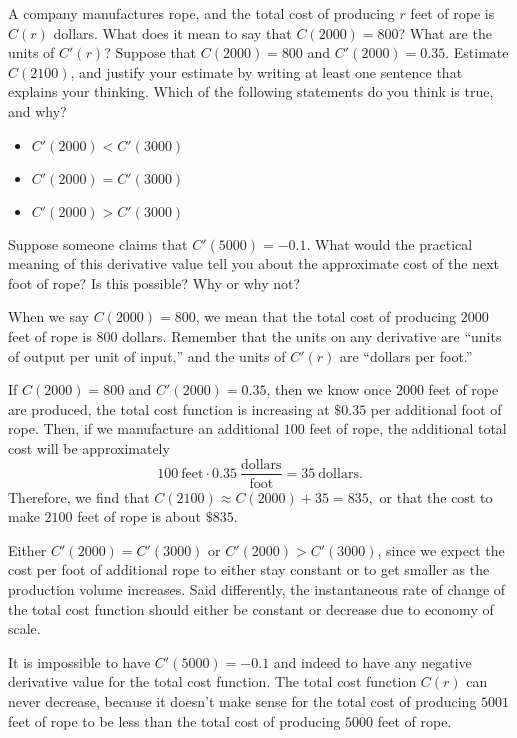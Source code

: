 \begin{example} \label{Ex:2.1.Eg4}
A company manufactures rope, and the total cost of producing $r$ feet of rope is $C(r)$ dollars.  What does it mean to say that $C(2000) = 800$? What are the units of $C'(r)$? Suppose that $C(2000) = 800$ and $C'(2000) = 0.35$.  Estimate $C(2100)$, and justify your estimate by writing at least one sentence that explains your thinking. Which of the following statements do you think is true, and why?
	\begin{itemize}
		\item $C'(2000) < C'(3000)$
		\item $C'(2000) = C'(3000)$
		\item $C'(2000) > C'(3000)$
	\end{itemize}
Suppose someone claims that $C'(5000) = -0.1$.  What would the practical meaning of this derivative value tell you about the approximate cost of the next foot of rope?  Is this possible?  Why or why not?  
	
\solution When we say $C(2000) = 800$, we mean that the total cost of producing $2000$ feet of rope is $800$ dollars.  Remember that the units on any derivative are ``units of output per unit of input,'' and the units of $C'(r)$ are ``dollars per foot.''

If $C(2000) = 800$ and $C'(2000) = 0.35$, then we know once $2000$ feet of rope are produced, the total cost function is increasing at $\$0.35$ per additional foot of rope.  Then, if we manufacture an additional $100$ feet of rope, the additional total cost will be approximately 
\[ 100 \ \mbox{feet} \cdot 0.35 \ \frac{\mbox{dollars}}{\mbox{foot}} = 35 \ \mbox{dollars}. \]
Therefore, we find that $C(2100) \approx C(2000) + 35 = 835,$ or that the cost to make $2100$ feet of rope is about $\$835$.

Either $C'(2000) = C'(3000)$ or $C'(2000) > C'(3000)$, since we expect the cost per foot of additional rope to either stay constant or to get smaller as the production volume increases.  Said differently, the instantaneous rate of change of the total cost function should either be constant or decrease due to economy of scale.

It is impossible to have $C'(5000) = -0.1$ and indeed to have any negative derivative value for the total cost function.  The total cost function $C(r)$ can never decrease, because it doesn't make sense for the total cost of producing $5001$ feet of rope to be less than the total cost of producing $5000$ feet of rope.

\end{example}